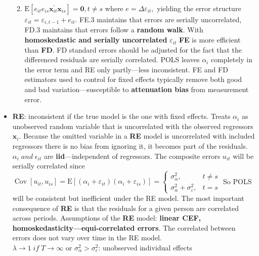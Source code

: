 \documentclass[
]{article}
\providecommand{\tightlist}{%
  \setlength{\itemsep}{0pt}\setlength{\parskip}{0pt}}
\begin{document}
\begin{itemize}
  \begin{enumerate}
  \def\labelenumi{(\alph{enumi})}
  \setcounter{enumi}{1}
  \tightlist
  \item
    \(\mathrm{E}\left[e_{i t} e_{i s} \mathbf{x}_{i t}^{\prime} \mathbf{x}_{i s}\right]=\mathbf{0}, t \neq s\)
    where \(e=\Delta \varepsilon_{i t},\) yielding the error structure
    \(\varepsilon_{i t}=\varepsilon_{i, t-1}+e_{i t}\). FE.3 maintains
    that errors are serially uncorrelated, FD.3 maintains that errors
    follow a \textbf{random walk}. With \textbf{homoskedastic and
    serially uncorrelated} \(\varepsilon_{it}\) \textbf{FE} is more
    efficient than \textbf{FD}. FD standard errors should be adjusted
    for the fact that the differenced residuals are serially correlated.
    POLS leaves \(\alpha_i\) completely in the error term and RE only
    partly---less inconsistent. FE and FD estimators used to control for
    fixed effects typically remove both good and bad
    variation---susceptible to \textbf{attenuation bias} from
    measurement error.
  \end{enumerate}
\item
  \textbf{RE}: inconsistent if the true model is the one with fixed
  effects. Treats \(\alpha_i\) as unobserved random variable that is
  uncorrelated with the observed regressors \(\mathbf{x}_{i}\). Because
  the omitted variable in a \textbf{RE} model is uncorrelated with
  included regressors there is no bias from ignoring it, it becomes part
  of the residuals. \(\alpha_i \; and\; \epsilon_{it}\) are
  \textbf{iid}---independent of regressors. The composite errors
  \(u_{i t}\) will be serially correlated since
  \(\operatorname{Cov}\left[u_{i t}, u_{i s}\right]=\mathrm{E}\left[\left(\alpha_{i}+\varepsilon_{i t}\right)\left(\alpha_{i}+\varepsilon_{i s}\right)\right]=\left\{\begin{array}{ll} \sigma_{\alpha}^{2}, & t \neq s \\ \sigma_{\alpha}^{2}+\sigma_{\varepsilon}^{2}, & t=s \end{array}\right.\)
  So POLS will be consistent but inefficient under the RE model. The
  most important consequence of \textbf{RE} is that the residuals for a
  given person are correlated across periods. Assumptions of the
  \textbf{RE} model: \textbf{linear CEF,
  homoskedasticity---equi-correlated errors}. The correlated between
  errors does not vary over time in the RE model.\\
  \(\lambda \to 1 \;if\; T \to \infty\) or
  \(\sigma_\alpha^2 > \sigma_\epsilon^2\): unobserved individual effects

\end{itemize}
\end{document}

